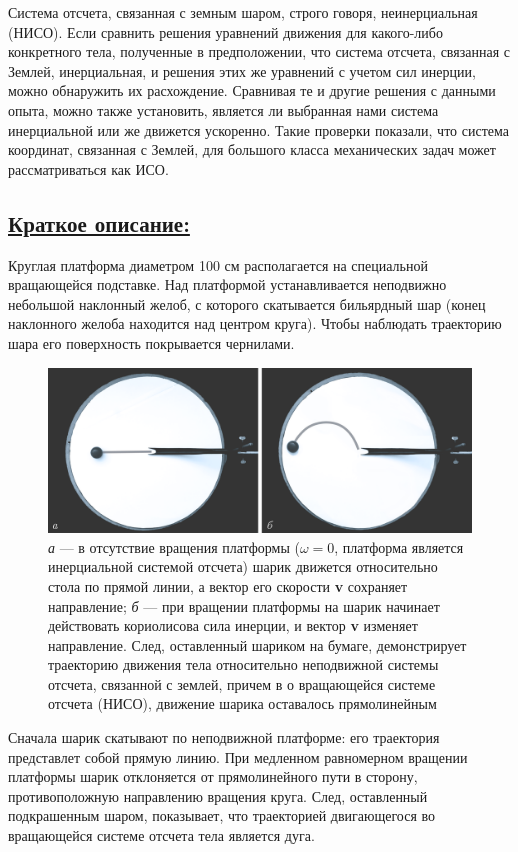 \documentclass[14pt,a4paper,oneside]{extarticle}	%
\begin{document}
		Система отсчета, связанная с земным шаром, строго говоря, неинерциальная (НИСО).
		Если сравнить решения уравнений движения для какого-либо конкретного тела, полученные в предположении, что система отсчета, связанная с Землей, инерциальная, и решения этих же уравнений с учетом сил инерции, можно обнаружить их расхождение.
		Сравнивая те и другие решения с данными опыта, можно также установить, является ли выбранная нами система инерциальной или же движется ускоренно.
		Такие проверки показали, что система координат, связанная с Землей, для большого класса механических задач может рассматриваться как ИСО.	
	
	
	\subsection*{\underline{Краткое описание:}}
	
Круглая платформа диаметром 100 см располагается на специальной вращающейся подставке. 
Над платформой устанавливается неподвижно небольшой наклонный желоб, с которого 
скатывается бильярдный шар (конец наклонного желоба находится над центром круга). 
Чтобы наблюдать траекторию шара его поверхность покрывается чернилами.

\begin{figure}[H] 	
	\centering 	
	\includegraphics[width=0.9\linewidth]{Coriolis-2.png}
	\caption{\textit{а} — в отсутствие вращения платформы ($ \omega=0 $, платформа является инерциальной системой отсчета) шарик движется относительно стола по прямой линии, а вектор его скорости \textbf{v} сохраняет направление; \textit{б} — при вращении платформы на шарик начинает действовать кориолисова сила инерции, и вектор \textbf{v} изменяет направление. След, оставленный шариком на бумаге, демонстрирует траекторию движения тела относительно неподвижной системы отсчета, связанной с землей, причем в о вращающейся системе отсчета (НИСО), движение шарика оставалось прямолинейным}
	\label{Coriolis-2}
\end{figure}

Сначала шарик скатывают по неподвижной платформе: его траектория представлет собой прямую линию.
При медленном равномерном вращении платформы шарик отклоняется от прямолинейного пути в сторону, противоположную направлению вращения круга.
След, оставленный подкрашенным шаром, показывает, что траекторией двигающегося во вращающейся системе отсчета тела является дуга.
\end{document}
